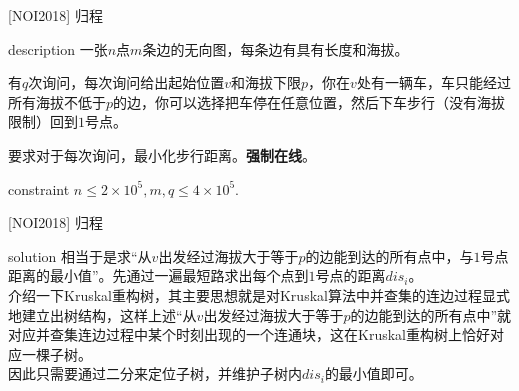 \documentclass{beamer}
\def\le{\leqslant}
\begin{document}
\begin{frame}{[NOI2018] 归程}
	\begin{block}{description}
		一张$n$点$m$条边的无向图，每条边有具有长度和海拔。
		
		有$q$次询问，每次询问给出起始位置$v$和海拔下限$p$，你在$v$处有一辆车，车只能经过所有海拔不低于$p$的边，你可以选择把车停在任意位置，然后下车步行（没有海拔限制）回到$1$号点。
		
		要求对于每次询问，最小化步行距离。\textbf{强制在线}。
	\end{block}
	\begin{block}{constraint}
		$n \le 2 \times 10^5, m, q \le 4 \times 10^5.$
	\end{block}
\end{frame}
\begin{frame}{[NOI2018] 归程}
	\begin{block}{solution}
		相当于是求“从$v$出发经过海拔大于等于$p$的边能到达的所有点中，与$1$号点距离的最小值”。先通过一遍最短路求出每个点到$1$号点的距离$dis_i$。\\
		
		介绍一下Kruskal重构树，其主要思想就是对Kruskal算法中并查集的连边过程显式地建立出树结构，这样上述“从$v$出发经过海拔大于等于$p$的边能到达的所有点中”就对应并查集连边过程中某个时刻出现的一个连通块，这在Kruskal重构树上恰好对应一棵子树。\\
		
		因此只需要通过二分来定位子树，并维护子树内$dis_i$的最小值即可。
	\end{block}
\end{frame}
\end{document}
